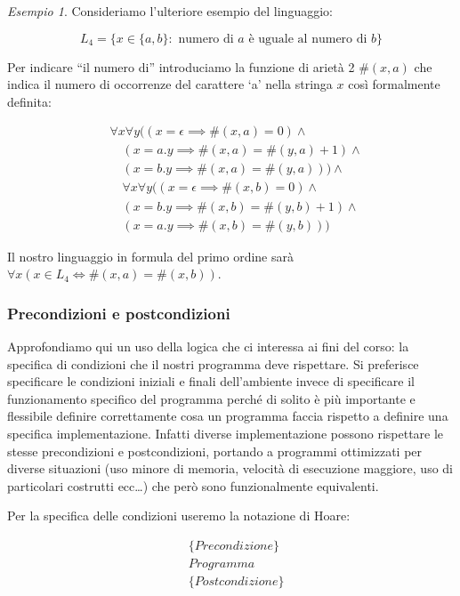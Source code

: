 \documentclass[a4paper,11pt,twoside]{article}
\theoremstyle{plain}
\theoremstyle{definition}
\theoremstyle{remark}
\newtheorem{esempio}{Esempio}[section]
\begin{document}
\begin{esempio}
  Consideriamo l'ulteriore esempio del linguaggio:

  \[
    L_4 = \{x \in \{a,b\} : \text{ numero di } a \text{ è uguale al numero di } b\}
  \]

  Per indicare ``il numero di'' introduciamo la funzione di arietà 2 $\#(x,a)$ che
  indica il numero di occorrenze del carattere `a' nella stringa $x$ così
  formalmente definita:

  \begin{align*}
    & \forall x \forall y ((x = \epsilon \implies \#(x,a)=0) \land \\
      & \quad (x = a.y \implies \#(x,a) = \#(y,a)+1) \land \\
      & \quad (x=b.y \implies \#(x,a) = \#(y,a))) \land \\
      & \quad \forall x \forall y ((x = \epsilon \implies \#(x,b)=0) \land \\
      & \quad (x = b.y \implies \#(x,b) = \#(y,b)+1) \land \\
      & \quad (x=a.y \implies \#(x,b) = \#(y,b)))
  \end{align*}

  Il nostro linguaggio in formula del primo ordine sarà
  $\forall x (x \in L_4 \iff \#(x,a)=\#(x,b))$.
\end{esempio}

\subsubsection{Precondizioni e postcondizioni}

Approfondiamo qui un uso della logica che ci interessa ai fini del corso: la
specifica di condizioni che il nostri programma deve rispettare. Si preferisce
specificare le condizioni iniziali e finali dell'ambiente invece di specificare
il funzionamento specifico del programma perché di solito è più importante e
flessibile definire correttamente cosa un programma faccia rispetto a definire
una specifica implementazione. Infatti diverse implementazione possono
rispettare le stesse precondizioni e postcondizioni, portando a programmi
ottimizzati per diverse situazioni (uso minore di memoria, velocità di
esecuzione maggiore, uso di particolari costrutti ecc\ldots) che però sono
funzionalmente equivalenti.

Per la specifica delle condizioni useremo la notazione di Hoare:

\begin{equation}
  \begin{aligned}
    & \{ \mathit{Precondizione} \} \\
    & \mathit{Programma} \\
    & \{ \mathit{Postcondizione} \}
  \end{aligned}
\end{equation}
\end{document}
